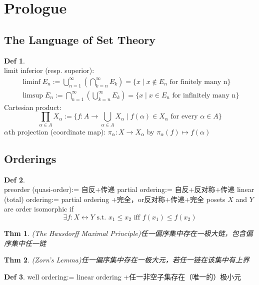 \documentclass[hidelinks]{article}
\theoremstyle{definition}
\newtheorem*{defin}{Def}
\theoremstyle{plain}
\newtheorem{theorem}{Thm}[section]
\theoremstyle{remark}
\begin{document}
\section{Prologue}

\subsection{The Language of Set Theory}
\begin{defin}~\\
limit inferior (resp. superior):
\begin{gather*}
\liminf E_n:=\bigcup_{n=1}^{\infty}\left(\bigcap_{k=n}^{\infty}E_k\right)=\{x\mid x\not\in E_n \textrm{ for finitely many n}\} \\
\limsup E_n:=\bigcap_{n=1}^{\infty}\left(\bigcup_{k=n}^{\infty}E_k\right)=\{x\mid x\in E_n \textrm{ for infinitely many n}\}
\end{gather*}
Cartesian product:
\[
\prod_{\alpha \in A}X_\alpha:=\{f:A\to \bigcup_{\alpha \in A}X_\alpha \mid f(\alpha)\in X_\alpha \textrm{ for every } \alpha \in A\}
\]
$\alpha$th projection (coordinate map): $\pi_\alpha:X\to X_\alpha$ by $\pi_\alpha(f)\mapsto f(\alpha)$
\end{defin}


\subsection{Orderings}
\begin{defin}~\\
preorder (quasi-order):= 自反+传递 \newline
partial ordering:= 自反+反对称+传递 \newline
linear (total) ordering:= partial ordering +完全，or反对称+传递+完全 \newline
posets $X$ and $Y$ are order isomorphic if 
$$\exists f: X\leftrightarrow Y \textrm{ s.t. } x_1\leq x_2 \textrm{ iff } f(x_1)\leq f(x_2)$$
\end{defin}

\begin{theorem}(The Hausdorff Maximal Principle)\label{Thm 0.1}
任一偏序集中存在一极大链，包含偏序集中任一链
\end{theorem}
\begin{theorem}(Zorn's Lemma)\label{Thm 0.2}
任一偏序集中存在一极大元，若任一链在该集中有上界
\end{theorem}

\begin{defin}
well ordering:= linear ordering +任一非空子集存在（唯一的）极小元
\end{defin}
\end{document}
